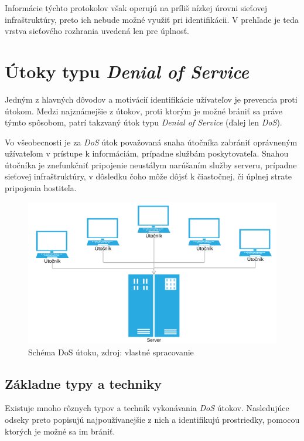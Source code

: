 \documentclass[
  digital, %
  table,   %
  lof,     %
  nolot,   %
  nocover
]{fithesis3}
\begin{document}
Informácie týchto protokolov však operujú na príliš nízkej úrovni sieťovej
infraštruktúry, preto ich nebude možné využiť pri identifikácii. V prehľade je 
teda vrstva sieťového rozhrania uvedená len pre úplnosť.

\chapter{Útoky typu \textit{Denial of Service}}
\label{ch:dos}
Jedným z hlavných dôvodov a motivácií identifikácie užívateľov je prevencia
proti útokom. Medzi najznámejšie z útokov, proti ktorým je možné brániť sa
práve týmto spôsobom, patrí takzvaný útok typu \textit{Denial of Service}
(ďalej len \textit{DoS}).

Vo všeobecnosti je za \textit{DoS} útok považovaná snaha útočníka zabrániť
oprávneným užívateľom v prístupe k informáciám, prípadne službám poskytovateľa.
Snahou útočníka je znefunkčniť pripojenie neustálym narúšaním služby serveru,
prípadne sieťovej infraštruktúry, v dôsledku čoho môže dôjsť k čiastočnej, či
úplnej strate pripojenia hostiteľa. 

\begin{figure}[h]
  \centering
    \includegraphics[width=\textwidth]{images/dos.png}
  \caption{Schéma DoS útoku, zdroj: vlastné spracovanie}
  \label{fig:dos}
\end{figure}

\section{Základne typy a techniky}
Existuje mnoho rôznych typov a techník vykonávania \textit{DoS} útokov.
Nasledujúce odseky preto popisujú najpoužívanejšie z nich a identifikujú
prostriedky, pomocou ktorých je možné sa im brániť.
\end{document}
